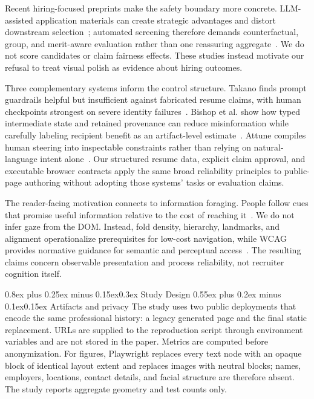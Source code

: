 \documentclass[9pt,twocolumn]{extarticle}
\makeatletter
\renewcommand{\section}{\@startsection{section}{1}{0pt}%
  {0.8ex plus 0.25ex minus 0.15ex}{0.3ex}%
  {\normalfont\large\bfseries\color{accent}}}
\renewcommand{\subsection}{\@startsection{subsection}{2}{0pt}%
  {0.55ex plus 0.2ex minus 0.1ex}{0.15ex}%
  {\normalfont\normalsize\bfseries}}
\makeatother
\begin{document}
Recent hiring-focused preprints make the safety boundary more concrete. LLM-assisted application materials can create strategic advantages and distort downstream selection~\cite{cohen2025}; automated screening therefore demands counterfactual, group, and merit-aware evaluation rather than one reassuring aggregate~\cite{yashwant2026}. We do not score candidates or claim fairness effects. These studies instead motivate our refusal to treat visual polish as evidence about hiring outcomes.

Three complementary systems inform the control structure. Takano finds prompt guardrails helpful but insufficient against fabricated resume claims, with human checkpoints strongest on severe identity failures~\cite{takano2026}. Bishop et al. show how typed intermediate state and retained provenance can reduce misinformation while carefully labeling recipient benefit as an artifact-level estimate~\cite{bishop2026}. Attune compiles human steering into inspectable constraints rather than relying on natural-language intent alone~\cite{chopra2026}. Our structured resume data, explicit claim approval, and executable browser contracts apply the same broad reliability principles to public-page authoring without adopting those systems' tasks or evaluation claims.

The reader-facing motivation connects to information foraging. People follow cues that promise useful information relative to the cost of reaching it~\cite{pirolli1999}. We do not infer gaze from the DOM. Instead, fold density, hierarchy, landmarks, and alignment operationalize prerequisites for low-cost navigation, while WCAG provides normative guidance for semantic and perceptual access~\cite{wcag22}. The resulting claims concern observable presentation and process reliability, not recruiter cognition itself.

\section{Study Design}
\subsection{Artifacts and privacy}
The study uses two public deployments that encode the same professional history: a legacy generated page and the final static replacement. URLs are supplied to the reproduction script through environment variables and are not stored in the paper. Metrics are computed before anonymization. For figures, Playwright replaces every text node with an opaque block of identical layout extent and replaces images with neutral blocks; names, employers, locations, contact details, and facial structure are therefore absent. The study reports aggregate geometry and test counts only.
\end{document}

